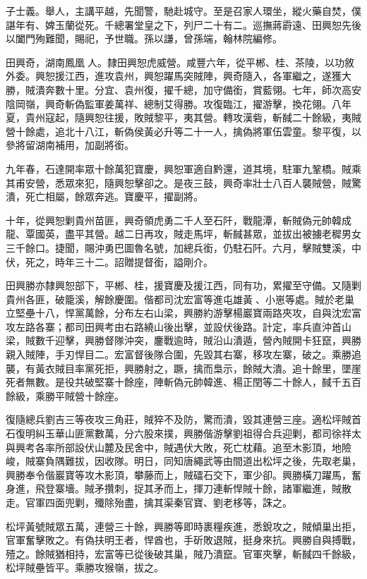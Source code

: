 \begin{pinyinscope}
子士義。舉人，主講平越，先聞警，馳赴城守。至是召家人環坐，縱火藥自焚，僕諶年有、婢玉蘭從死。千總署堂皇之下，列尸二十有二。巡撫蔣霨遠、田興恕先後以闔門殉難聞，賜祀，予世職。孫以謙，曾孫端，翰林院編修。

田興奇，湖南鳳凰人。隸田興恕虎威營。咸豐六年，從平郴、桂、茶陵，以功敘外委。興恕援江西，進攻袁州，興恕躍馬突賊陣，興奇隨入，各軍繼之，遂獲大勝，賊潰奔數十里。分宜、袁州復，擢千總，加守備銜，賞藍翎。七年，師次高安陰岡嶺，興奇斬偽監軍姜萬祥、總制艾得勝。攻復臨江，擢游擊，換花翎。八年夏，貴州寇起，隨興恕往援，敗賊黎平，夷其營。轉攻漢砦，斬馘二十餘級，夷賊營十餘處，追北十八江，斬偽侯黃必升等二十一人，擒偽將軍伍雲童。黎平復，以參將留湖南補用，加副將銜。

九年春，石達開率眾十餘萬犯寶慶，興恕軍適自黔還，道其境，駐軍九鞏橋。賊乘其甫安營，悉眾來犯，隨興恕擊卻之。是夜三鼓，興奇率壯士八百人襲賊營，賊驚潰，死亡相屬，餘眾奔逃。寶慶平，擢副將。

十年，從興恕剿貴州苗匪，興奇領虎勇二千人至石阡，戰龍潭，斬賊偽元帥韓成龍、覃國英，盡平其營。越二日再攻，賊走馬坪，斬馘甚眾，並拔出被擄老穉男女三千餘口。捷聞，賜沖勇巴圖魯名號，加總兵銜，仍駐石阡。六月，擊賊雙溪，中伏，死之，時年三十二。詔贈提督銜，謚剛介。

田興勝亦隸興恕部下，平郴、桂，援寶慶及援江西，同有功，累擢至守備。又隨剿貴州各匪，破籠溪，解餘慶圍。偕都司沈宏富等進屯雄黃、小崽等處。賊於老巢立堅壘十八，悍黨萬餘，分布左右山梁，興勝約游擊楊巖寶兩路夾攻，自與沈宏富攻左路各寨；都司田興考由右路繞山後出擊，並設伏後路。計定，率兵直沖首山梁，賊數千迎擊，興勝督隊沖突，鏖戰逾時，賊沿山潰遁，營內賊開卡狂竄，興勝親入賊陣，手刃悍目二。宏富督後隊合圍，先毀其右寨，移攻左寨，破之。乘勝追襲，有黃衣賊目率黨死拒，興勝射之，蹶，擒而梟示，餘賊大潰。追十餘里，墜崖死者無數。是役共破堅寨十餘座，陣斬偽元帥韓進、楊正閏等二十餘人，馘千五百餘級，乘勝平賊營十餘座。

復隨總兵劉吉三等夜攻三角莊，賊猝不及防，驚而潰，毀其連營三座。適松坪賊首石復明糾玉華山匪黨數萬，分六股來撲，興勝偕游擊劉祖得合兵迎剿，都司徐祥太與興考各率所部設伏山麓及民舍中，賊遇伏大敗，死亡枕藉。追至木影頂，地險峻，賊寨負隅難拔，因收隊。明日，同知唐繩武等由間道出松坪之後，先取老巢，興勝奉令偕巖寶等攻木影頂，攀藤而上，賊礌石交下，軍少卻。興勝橫刀躍馬，奮身進，飛登寨墻。賊矛攢刺，捉其矛而上，揮刀連斬悍賊十餘，諸軍繼進，賊散走。官軍四面兜剿，殲除殆盡，擒其渠秦官寶、劉老栘等，誅之。

松坪黃號賊眾五萬，連營三十餘，興勝等即時裹糧疾進，悉銳攻之，賊傾巢出拒，官軍奮擊敗之。有偽扶明王者，悍酋也，手斫敗退賊，挺身來抗。興勝自與搏戰，殪之。餘賊猶相持，宏富等已從後破其巢，賊乃潰竄。官軍夾擊，斬馘四千餘級，松坪賊壘皆平。乘勝攻猴嶺，拔之。


\end{pinyinscope}
